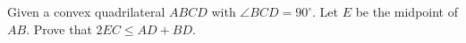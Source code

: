 Given a convex quadrilateral $ABCD$ with $\angle BCD=90^\circ$. Let $E$ be the midpoint of $AB$. Prove that $2EC \leqslant AD+BD$.